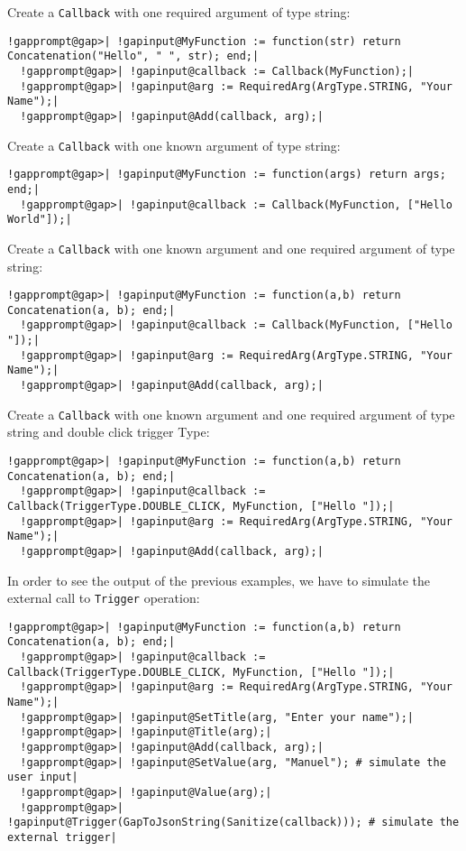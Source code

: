 \documentclass[a4paper,11pt]{report}
\begin{document}
{{{ Create a \texttt{Callback} with one required argument of type string: 
\begin{Verbatim}[commandchars=!@|,fontsize=\small,frame=single,label=Example]
  !gapprompt@gap>| !gapinput@MyFunction := function(str) return Concatenation("Hello", " ", str); end;|
  !gapprompt@gap>| !gapinput@callback := Callback(MyFunction);|
  !gapprompt@gap>| !gapinput@arg := RequiredArg(ArgType.STRING, "Your Name");|
  !gapprompt@gap>| !gapinput@Add(callback, arg);|
\end{Verbatim}
 

 Create a \texttt{Callback} with one known argument of type string: 
\begin{Verbatim}[commandchars=!@|,fontsize=\small,frame=single,label=Example]
  !gapprompt@gap>| !gapinput@MyFunction := function(args) return args; end;|
  !gapprompt@gap>| !gapinput@callback := Callback(MyFunction, ["Hello World"]);|
\end{Verbatim}
 

 Create a \texttt{Callback} with one known argument and one required argument of type string: 
\begin{Verbatim}[commandchars=!@|,fontsize=\small,frame=single,label=Example]
  !gapprompt@gap>| !gapinput@MyFunction := function(a,b) return Concatenation(a, b); end;|
  !gapprompt@gap>| !gapinput@callback := Callback(MyFunction, ["Hello "]);|
  !gapprompt@gap>| !gapinput@arg := RequiredArg(ArgType.STRING, "Your Name");|
  !gapprompt@gap>| !gapinput@Add(callback, arg);|
\end{Verbatim}
 

 Create a \texttt{Callback} with one known argument and one required argument of type string and double
click trigger Type: 
\begin{Verbatim}[commandchars=!@|,fontsize=\small,frame=single,label=Example]
  !gapprompt@gap>| !gapinput@MyFunction := function(a,b) return Concatenation(a, b); end;|
  !gapprompt@gap>| !gapinput@callback := Callback(TriggerType.DOUBLE_CLICK, MyFunction, ["Hello "]);|
  !gapprompt@gap>| !gapinput@arg := RequiredArg(ArgType.STRING, "Your Name");|
  !gapprompt@gap>| !gapinput@Add(callback, arg);|
\end{Verbatim}
 

 In order to see the output of the previous examples, we have to simulate the
external call to \texttt{Trigger} operation: 
\begin{Verbatim}[commandchars=!@|,fontsize=\small,frame=single,label=Example]
  !gapprompt@gap>| !gapinput@MyFunction := function(a,b) return Concatenation(a, b); end;|
  !gapprompt@gap>| !gapinput@callback := Callback(TriggerType.DOUBLE_CLICK, MyFunction, ["Hello "]);|
  !gapprompt@gap>| !gapinput@arg := RequiredArg(ArgType.STRING, "Your Name");|
  !gapprompt@gap>| !gapinput@SetTitle(arg, "Enter your name");|
  !gapprompt@gap>| !gapinput@Title(arg);|
  !gapprompt@gap>| !gapinput@Add(callback, arg);|
  !gapprompt@gap>| !gapinput@SetValue(arg, "Manuel"); # simulate the user input|
  !gapprompt@gap>| !gapinput@Value(arg);|
  !gapprompt@gap>| !gapinput@Trigger(GapToJsonString(Sanitize(callback))); # simulate the external trigger|
\end{Verbatim}
 

}}}
\end{document}
